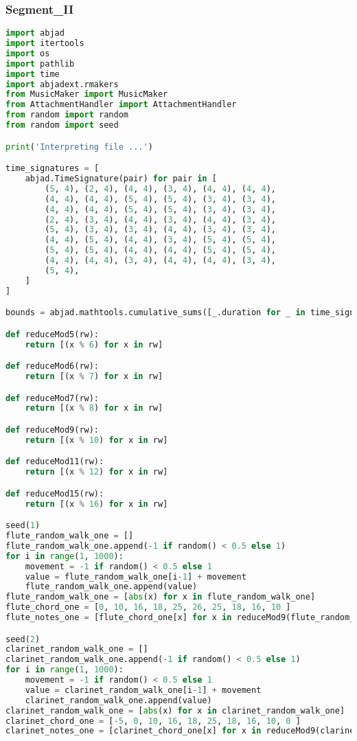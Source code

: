 \subsubsection{Segment\_II}
\singlespace
\begin{lstlisting}[language=Python, caption=Tianshu Segment\_II]
import abjad
import itertools
import os
import pathlib
import time
import abjadext.rmakers
from MusicMaker import MusicMaker
from AttachmentHandler import AttachmentHandler
from random import random
from random import seed

print('Interpreting file ...')

time_signatures = [
    abjad.TimeSignature(pair) for pair in [
        (5, 4), (2, 4), (4, 4), (3, 4), (4, 4), (4, 4),
        (4, 4), (4, 4), (5, 4), (5, 4), (3, 4), (3, 4),
        (4, 4), (4, 4), (5, 4), (5, 4), (3, 4), (3, 4),
        (2, 4), (3, 4), (4, 4), (3, 4), (4, 4), (3, 4),
        (5, 4), (3, 4), (3, 4), (4, 4), (3, 4), (3, 4),
        (4, 4), (5, 4), (4, 4), (3, 4), (5, 4), (5, 4),
        (5, 4), (5, 4), (4, 4), (4, 4), (5, 4), (5, 4),
        (4, 4), (4, 4), (3, 4), (4, 4), (4, 4), (3, 4),
        (5, 4),
    ]
]

bounds = abjad.mathtools.cumulative_sums([_.duration for _ in time_signatures])

def reduceMod5(rw):
    return [(x % 6) for x in rw]

def reduceMod6(rw):
    return [(x % 7) for x in rw]

def reduceMod7(rw):
    return [(x % 8) for x in rw]

def reduceMod9(rw):
    return [(x % 10) for x in rw]

def reduceMod11(rw):
    return [(x % 12) for x in rw]

def reduceMod15(rw):
    return [(x % 16) for x in rw]

seed(1)
flute_random_walk_one = []
flute_random_walk_one.append(-1 if random() < 0.5 else 1)
for i in range(1, 1000):
    movement = -1 if random() < 0.5 else 1
    value = flute_random_walk_one[i-1] + movement
    flute_random_walk_one.append(value)
flute_random_walk_one = [abs(x) for x in flute_random_walk_one]
flute_chord_one = [0, 10, 16, 18, 25, 26, 25, 18, 16, 10 ]
flute_notes_one = [flute_chord_one[x] for x in reduceMod9(flute_random_walk_one)]

seed(2)
clarinet_random_walk_one = []
clarinet_random_walk_one.append(-1 if random() < 0.5 else 1)
for i in range(1, 1000):
    movement = -1 if random() < 0.5 else 1
    value = clarinet_random_walk_one[i-1] + movement
    clarinet_random_walk_one.append(value)
clarinet_random_walk_one = [abs(x) for x in clarinet_random_walk_one]
clarinet_chord_one = [-5, 0, 10, 16, 18, 25, 18, 16, 10, 0 ]
clarinet_notes_one = [clarinet_chord_one[x] for x in reduceMod9(clarinet_random_walk_one)]


\end{lstlisting}
